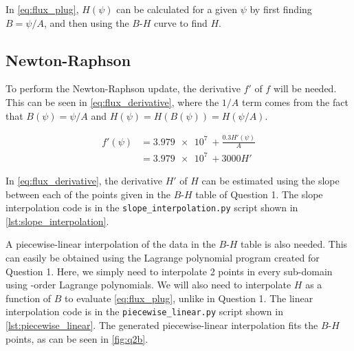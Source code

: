 \documentclass[a4paper,titlepage]{article}
\newcommand{\code}[1]{\texttt{#1}}
\begin{document}
	\begin{equation} \label{eq:flux_plug}
		
	\end{equation}
	
	In \cref{eq:flux_plug}, $H(\psi)$ can be calculated for a given $\psi$ by first finding $B = \psi / A$, and then using the $B$-$H$ curve to find $H$.
	
	\subsection{Newton-Raphson}
	
	To perform the Newton-Raphson update, the derivative $f'$ of $f$ will be needed. This can be seen in \cref{eq:flux_derivative}, where the $1/A$ term comes from the fact that $B(\psi) = \psi / A$ and $H(\psi) = H(B(\psi)) = H(\psi / A)$.
	
	\begin{equation} \label{eq:flux_derivative}
		\begin{split}
			f'(\psi) &= \SI{3.979e7}{} + \frac{0.3H'(\psi)}{A} \\
			&= \SI{3.979e7}{} + 3000 H'
		\end{split}
	\end{equation}
	
	In \cref{eq:flux_derivative}, the derivative $H'$ of $H$ can be estimated using the slope between each of the points given in the $B$-$H$ table of Question 1.	The slope interpolation code is in the \code{slope\_interpolation.py} script shown in \cref{lst:slope_interpolation}.
	
	A piecewise-linear interpolation of the data in the $B$-$H$ table is also needed. This can easily be obtained using the Lagrange polynomial program created for Question 1. Here, we simply need to interpolate 2 points in every sub-domain using -order Lagrange polynomials. We will also need to interpolate $H$ as a function of $B$ to evaluate \cref{eq:flux_plug}, unlike in Question 1. The linear interpolation code is in the \code{piecewise\_linear.py} script shown in \cref{lst:piecewise_linear}. The generated piecewise-linear interpolation fits the $B$-$H$ points, as can be seen in \cref{fig:q2b}.
	
\end{document}
